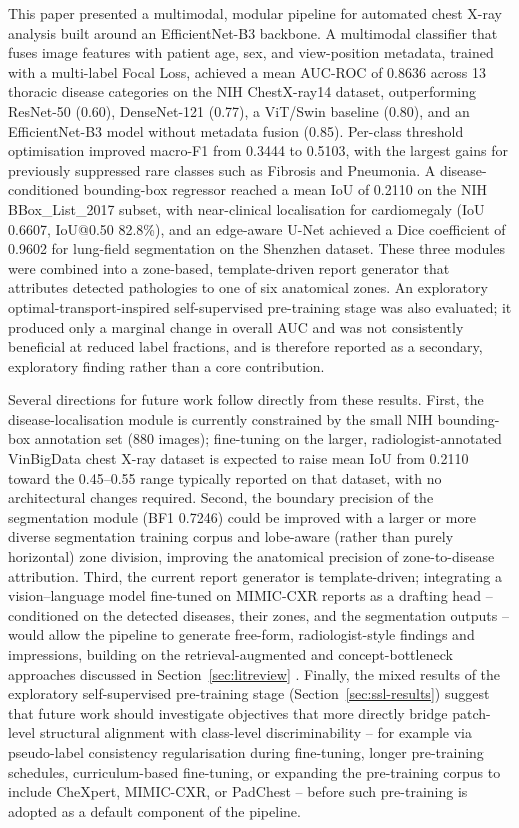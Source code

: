 \documentclass[preprint,12pt,authoryear]{elsarticle}
\begin{document}
This paper presented a multimodal, modular pipeline for automated chest X-ray analysis built around an EfficientNet-B3 backbone. A multimodal classifier that fuses image features with patient age, sex, and view-position metadata, trained with a multi-label Focal Loss, achieved a mean AUC-ROC of 0.8636 across 13 thoracic disease categories on the NIH ChestX-ray14 dataset, outperforming ResNet-50 (0.60), DenseNet-121 (0.77), a ViT/Swin baseline (0.80), and an EfficientNet-B3 model without metadata fusion (0.85). Per-class threshold optimisation improved macro-F1 from 0.3444 to 0.5103, with the largest gains for previously suppressed rare classes such as Fibrosis and Pneumonia. A disease-conditioned bounding-box regressor reached a mean IoU of 0.2110 on the NIH BBox\_List\_2017 subset, with near-clinical localisation for cardiomegaly (IoU 0.6607, IoU@0.50 82.8\%), and an edge-aware U-Net achieved a Dice coefficient of 0.9602 for lung-field segmentation on the Shenzhen dataset. These three modules were combined into a zone-based, template-driven report generator that attributes detected pathologies to one of six anatomical zones. An exploratory optimal-transport-inspired self-supervised pre-training stage was also evaluated; it produced only a marginal change in overall AUC and was not consistently beneficial at reduced label fractions, and is therefore reported as a secondary, exploratory finding rather than a core contribution.

Several directions for future work follow directly from these results. First, the disease-localisation module is currently constrained by the small NIH bounding-box annotation set (880 images); fine-tuning on the larger, radiologist-annotated VinBigData chest X-ray dataset is expected to raise mean IoU from 0.2110 toward the 0.45--0.55 range typically reported on that dataset, with no architectural changes required. Second, the boundary precision of the segmentation module (BF1 0.7246) could be improved with a larger or more diverse segmentation training corpus and lobe-aware (rather than purely horizontal) zone division, improving the anatomical precision of zone-to-disease attribution. Third, the current report generator is template-driven; integrating a vision--language model fine-tuned on MIMIC-CXR reports as a drafting head -- conditioned on the detected diseases, their zones, and the segmentation outputs -- would allow the pipeline to generate free-form, radiologist-style findings and impressions, building on the retrieval-augmented and concept-bottleneck approaches discussed in Section~\ref{sec:litreview} \citep{xrem,concept_rag}. Finally, the mixed results of the exploratory self-supervised pre-training stage (Section~\ref{sec:ssl-results}) suggest that future work should investigate objectives that more directly bridge patch-level structural alignment with class-level discriminability -- for example via pseudo-label consistency regularisation during fine-tuning, longer pre-training schedules, curriculum-based fine-tuning, or expanding the pre-training corpus to include CheXpert, MIMIC-CXR, or PadChest -- before such pre-training is adopted as a default component of the pipeline.




\end{document}

